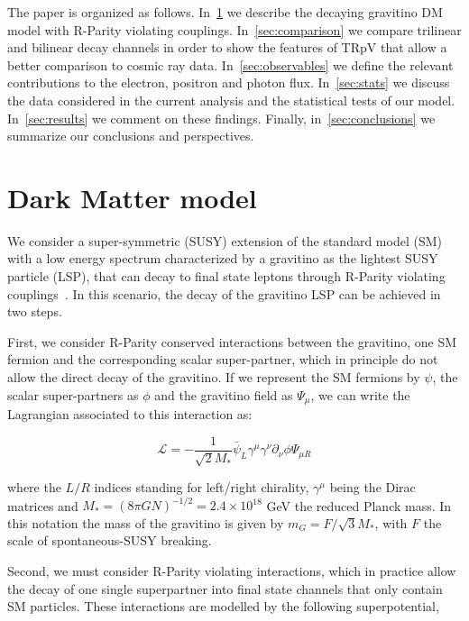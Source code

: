 \documentclass[a4paper,11pt]{article}
\begin{document}
The paper is organized as follows. In~\cref{sec:gdecay} we describe the decaying gravitino DM model with R-Parity violating couplings. In~\cref{sec:comparison} we compare trilinear and bilinear decay channels in order to show the features of TRpV that allow a better comparison to cosmic ray data. In~\cref{sec:observables} we define the relevant contributions to the electron, positron and photon flux. In~\cref{sec:stats} we discuss the data considered in the current analysis and the statistical tests of our model. In~\cref{sec:results} we comment on these findings. Finally, in~\cref{sec:conclusions} we summarize our conclusions and perspectives.  
 
\section{Dark Matter model}
\label{sec:gdecay}

We consider a super-symmetric (SUSY) extension of the standard model (SM) with a low energy spectrum characterized by a gravitino as the lightest SUSY particle (LSP), that can decay to final state leptons through R-Parity violating couplings~\cite{Grefe:2011dp, Moreau:2001sr}. In this scenario, the decay of the gravitino LSP can be achieved in two steps. 

First, we consider R-Parity conserved interactions between the gravitino, one SM fermion and the corresponding scalar super-partner, which in principle do not allow the direct decay of the gravitino. If we represent the SM fermions by $\psi$, the scalar super-partners as $\phi$ and the gravitino field as $\Psi_\mu$, we can write the Lagrangian associated to this interaction as:

\begin{equation}
  \mathcal{L} = −\frac{1}{\sqrt{2}M_{*}}\bar{\psi}_{L}\gamma^{\mu}\gamma^{\nu}\partial_{\nu}\phi\Psi_{\mu R}
\end{equation}

\noindent where the $L/R$ indices standing for left/right chirality, $\gamma^\mu$ being the Dirac matrices and $M_* = (8\pi G N)^{-1/2} = 2.4\times 10^{18}$ GeV the reduced Planck mass. In this notation the mass of the gravitino is given by $m_G = F/\sqrt{3}M_*$, with $F$ the scale of spontaneous-SUSY breaking. 

Second, we must consider R-Parity violating interactions, which in practice allow the decay of one single superpartner into final state channels that only contain SM particles. These interactions are modelled by the following superpotential,
\end{document}
